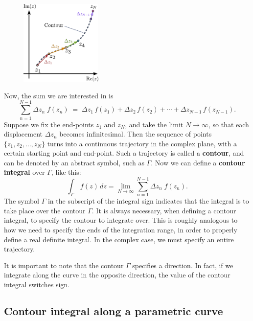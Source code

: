 \documentclass[10pt,a4paper]{article}
\begin{document}
\begin{figure}[h]
  \centering\includegraphics[width=0.36\textwidth]{complex_integral}
\end{figure}

Now, the sum we are interested in is
\begin{equation}
  \sum_{n=1}^{N-1} \Delta z_n\; f(z_n) \;=\; \Delta z_1\, f(z_1)
  + \Delta z_2\, f(z_2) + \cdots + \Delta z_{N-1}\, f(z_{N-1}).
\end{equation}
Suppose we fix the end-points $z_1$ and $z_N$, and take the limit $N
\rightarrow \infty$, so that each displacement $\Delta z_{n}$ becomes
infinitesimal. Then the sequence of points $\{z_1, z_2, \dots, z_N\}$
turns into a continuous trajectory in the complex plane, with a
certain starting point and end-point. Such a trajectory is called a
\textbf{contour}, and can be denoted by an abstract symbol, such as
$\Gamma$. Now we can define a \textbf{contour integral} over $\Gamma$,
like this:
\begin{equation}
  \int_\Gamma \, f(z)\, dz = \lim_{N \rightarrow \infty} \sum_{n=1}^{N-1} \Delta z_n\; f(z_n).
\end{equation}
The symbol $\Gamma$ in the subscript of the integral sign indicates
that the integral is to take place over the contour $\Gamma$. It is
always necessary, when defining a contour integral, to specify the
contour to integrate over. This is roughly analogous to how we need to
specify the ends of the integration range, in order to properly define
a real definite integral. In the complex case, we must specify an
entire trajectory.

It is important to note that the contour $\Gamma$ specifies a
direction. In fact, if we integrate along the curve in the opposite
direction, the value of the contour integral switches sign.

\subsection{Contour integral along a parametric curve}
\label{contour-integral-along-a-parametric-curve}
\end{document}
